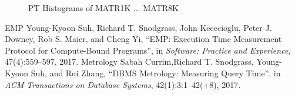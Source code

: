 \documentclass[10pt]{article}
\begin{document}
\begin{figure}[h]
	\centering
	\caption{PT Histograms of MATR1K ... MATR8K~\label{fig:matr}}
\end{figure}


\newcommand{\etalchar}[1]{$^{#1}$}
\begin{thebibliography}{99}
\vspace{0.1em}
\bibitem
{EMP}
Young-Kyoon Suh, Richard T. Snodgrass, John Kececioglu, Peter J. Downey, Rob S. Maier, and Cheng Yi, ``EMP: Execution Time Measurement Protocol for Compute-Bound Programs'', in {\em Software: Practice and Experience}, 47(4):559--597, 2017.
\bibitem
{Metrology}
Sabah Currim,Richard T. Snodgrass, Young-Kyoon Suh, and Rui Zhang, ``DBMS Metrology: Measuring Query Time'', in {\em ACM Transactions on Database Systems}, 42(1):3:1--42(+8), 2017.
\end{thebibliography}
\end{document}
